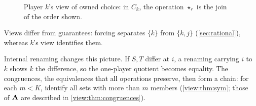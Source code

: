 \begin{figure}[htb]
\centering
{}
\caption{Player $k$'s view of owned choice: in $C_k$, the operation $\star_r$ is the join of the order shown.}
\label{fig:views}
\end{figure}

Views differ from guarantees: forcing separates $\{k\}$ from $\{k,j\}$ (\cref{sec:rational}), whereas $k$'s view identifies them.

Internal renaming changes this picture. If $S,T$ differ at $i$, a renaming carrying $i$ to $k$ shows $k$ the difference, so the one-player quotient becomes equality. The congruences, the equivalences that all operations preserve, then form a chain: for each $m<K$, identify all sets with more than $m$ members (\cref{view:thm:sym}; those of $\mathbf A$ are described in \cref{view:thm:congruences}).
